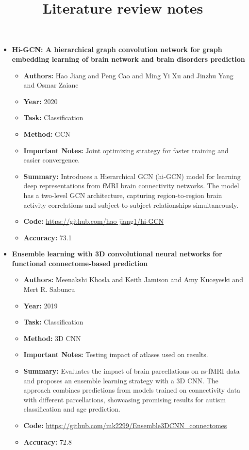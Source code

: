 \documentclass{article}
\title{Literature review notes}
\begin{document}
\maketitle

\begin{itemize}[left=0pt]
  \item \textbf{Hi-GCN: A hierarchical graph convolution network for graph embedding learning of brain network and brain disorders prediction}
  \begin{itemize}
    \item \textbf{Authors:} Hao Jiang and Peng Cao and Ming Yi Xu and Jinzhu Yang and Osmar Zaiane
    \item \textbf{Year:} 2020
    \item \textbf{Task:} Classification
    \item \textbf{Method:} GCN
    \item \textbf{Important Notes:} Joint optimizing strategy for faster training and easier convergence.
    \item \textbf{Summary:} Introduces a Hierarchical GCN (hi-GCN) model for learning deep representations from fMRI brain connectivity networks. The model has a two-level GCN architecture, capturing region-to-region brain activity correlations and subject-to-subject relationships simultaneously.
    \item \textbf{Code:} \url{https://github.com/hao jiang1/hi-GCN}
    \item \textbf{Accuracy:} 73.1
  \end{itemize}

  \item \textbf{Ensemble learning with 3D convolutional neural networks for functional connectome-based prediction}
  \begin{itemize}
    \item \textbf{Authors:} Meenakshi Khosla and Keith Jamison and Amy Kuceyeski and Mert R. Sabuncu
    \item \textbf{Year:} 2019
    \item \textbf{Task:} Classification
    \item \textbf{Method:} 3D CNN
    \item \textbf{Important Notes:} Testing impact of atlases used on results.
    \item \textbf{Summary:} Evaluates the impact of brain parcellations on rs-fMRI data and proposes an ensemble learning strategy with a 3D CNN. The approach combines predictions from models trained on connectivity data with different parcellations, showcasing promising results for autism classification and age prediction.
    \item \textbf{Code:} \url{https://github.com/mk2299/Ensemble3DCNN_connectomes}
    \item \textbf{Accuracy:} 72.8
  \end{itemize}


\end{itemize}
\end{document}
